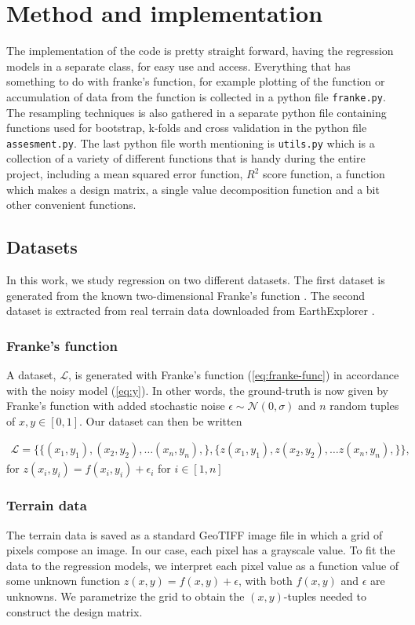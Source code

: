 \documentclass[../main.tex]{subfiles}
\begin{document}
\section{Method and implementation}\label{sec:method}
The implementation of the code is pretty straight forward, having the regression models in a separate class, for easy use and access. Everything that has something to do with franke's function, for example plotting of the function or accumulation of data from the function is collected in a python file \verb|franke.py|. The resampling techniques is also gathered in a separate python file containing functions used for bootstrap, k-folds and cross validation in the python file \verb|assesment.py|. The last python file worth mentioning is \verb|utils.py| which is a collection of a variety of different functions that is handy during the entire project, including a mean squared error function, $R^2$ score function, a function which makes a design matrix, a single value decomposition function and a bit other convenient functions.

\subsection{Datasets}
In this work, we study regression on two different datasets. The first dataset is generated from the known two-dimensional Franke's function \cite{FrankeRichard1979}. The second dataset is extracted from real terrain data downloaded from EarthExplorer \cite{EarthExplorer}. 

\subsubsection{Franke's function}
A dataset, \ensuremath{\mathcal{L}}, is generated with Franke's function (\cref{eq:franke-func}) in accordance with the noisy model (\cref{eq:y}). In other words, the ground-truth is now given by Franke's function with added stochastic noise \ensuremath{\epsilon\sim\mathcal{N}(0,\sigma)} and $n$ random tuples of \ensuremath{x,y \in [0,1]}. Our dataset can then be written

\begin{align*}
    \mathcal{L}=\{\{(x_1,y_1), (x_2,y_2), \ldots (x_n,y_n),\},\{z(x_1,y_1),z(x_2,y_2), \ldots z(x_n,y_n),\}\},
\end{align*} for \ensuremath{z(x_i,y_i)=f(x_i,y_i)+\epsilon_i} for \ensuremath{i \in [1, n]}

\subsubsection{Terrain data}
The terrain data is saved as a standard GeoTIFF image file in which a grid of pixels compose an image. In our case, each pixel has a grayscale value. To fit the data to the regression models, we interpret each pixel value as a function value of some unknown function \ensuremath{z(x,y)=f(x,y)+\epsilon}, with both \ensuremath{f(x,y)} and $\epsilon$ are unknowns. We parametrize the grid to obtain the \ensuremath{(x,y)}-tuples needed to construct the design matrix. 
\end{document}
